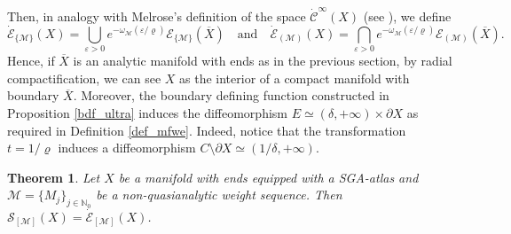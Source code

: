 \documentclass[11pt,reqno]{amsart}
\numberwithin{equation}{section}
\newtheorem{theorem}{Theorem}[section]
\newcommand{\E}{{\mathcal{E}}}
\newcommand{\Mj}{{\{M_j\}_{j\in\mathbb{N}_0}}} %
\newcommand{\M}{{\mathcal{M}}} %
\newcommand{\X}{{\overline{X}}}
\begin{document}
Then, in analogy with Melrose's definition of the space $\dot{\mathcal{C}}^\infty(X)$ (see \cite{Melrose_GST}), we define
%
\begin{equation}\label{eq:GSspacesmwe}
\dot{\E}_{\{\M\}}(X) = \bigcup_{\varepsilon>0}e^{-\omega_\M(\varepsilon /\varrho)}\E_{\{\M\}}(\X) \quad\text{and}\quad \dot{\E}_{(\M)}(X) = \bigcap_{\varepsilon>0}e^{-\omega_\M(\varepsilon /\varrho)}\E_{(\M)}(\X).
\end{equation}
%
Hence, if $\X$ is an analytic manifold with ends as in the previous section, by radial compactification, we can see $X$ as the interior of a compact manifold with boundary $\X$. Moreover, the boundary defining function constructed in Proposition \ref{bdf_ultra} induces the diffeomorphism $E\simeq (\delta,+\infty)\times\partial X$ as required in Definition \ref{def_mfwe}. Indeed, notice that the transformation $t = 1/\varrho$ induces a diffeomorphism $C\setminus\partial X \simeq (1/\delta,+\infty)$.
%
\begin{theorem}
	Let $X$ be a manifold with ends equipped with a SGA-atlas and $\M=\Mj$ be a non-quasianalytic weight sequence. Then $\mathcal{S}_{[\M]}(X) = \dot{\E}_{[\M]}(X)$.
\end{theorem}
%
\end{document}
